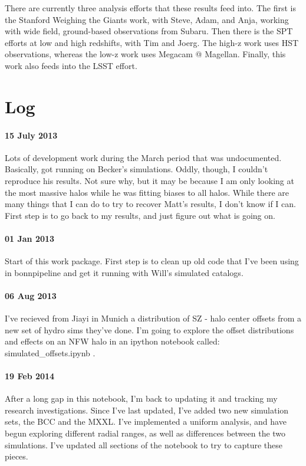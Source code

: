 \documentclass[11pt]{article}
\begin{document}
There are currently three analysis efforts that these results feed into. The first is the Stanford Weighing the Giants work, with Steve, Adam, and Anja, working with wide field, ground-based observations from Subaru. Then there is the SPT efforts at low and high redshifts, with Tim and Joerg. The high-z work uses HST observations, whereas the low-z work uses Megacam @ Magellan. Finally, this work also feeds into the LSST effort.



\section{Log}

\paragraph{15 July 2013}
Lots of development work during the March period that was undocumented. 
Basically, got running on Becker's simulations. 
Oddly, though, I couldn't reproduce his results. 
Not sure why, but it may be because I am only looking at the most massive halos while he was fitting biases to all halos.
While there are many things that I can do to try to recover Matt's results, I don't know if I can.
First step is to go back to my results, and just figure out what is going on.


\paragraph{01 Jan 2013}
Start of this work package. 
First step is to clean up old code that I've been using in bonnpipeline and get it running with Will's simulated catalogs.

\paragraph{06 Aug 2013}
I've recieved from Jiayi in Munich a distribution of SZ - halo center offsets from a new set of hydro sims they've done. I'm going to explore the offset distributions and effects on an NFW halo in an ipython notebook called: simulated\_offsets.ipynb .

\paragraph{19 Feb 2014}
After a long gap in this notebook, I'm back to updating it and tracking my research investigations. Since I've last updated, I've added two new simulation sets, the BCC and the MXXL. I've implemented a uniform analysis, and have begun exploring different radial ranges, as well as differences between the two simulations. I've updated all sections of the notebook to try to capture these pieces.
\end{document}
